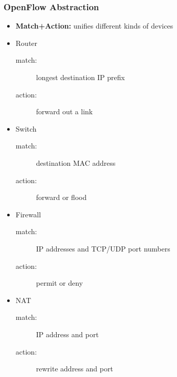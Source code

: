 \subsubsection{OpenFlow Abstraction}
\begin{itemize}
	\item \textbf{Match+Action:} unifies different kinds of devices
	\item Router
	\begin{description}
		\item[match:] longest destination IP prefix
		\item[action:] forward out a link
	\end{description}
	\item Switch
	\begin{description}
		\item[match:] destination MAC address
		\item[action:] forward or flood
	\end{description}
	\item Firewall
	\begin{description}
		\item[match:] IP addresses and TCP/UDP port numbers
		\item[action:] permit or deny
	\end{description}
	\item NAT
	\begin{description}
		\item[match:] IP address and port
		\item[action:] rewrite address and port
	\end{description}
\end{itemize}